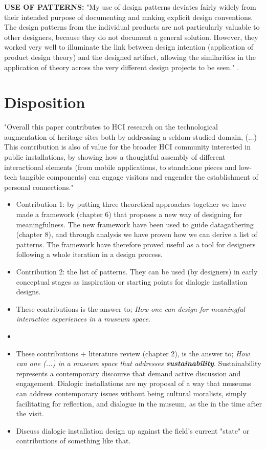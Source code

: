 \textbf{USE OF PATTERNS:} "My use of design patterns deviates fairly widely from their intended purpose of documenting and making explicit design conventions. The design patterns from the individual products are not particularly valuable to other designers, because they do not document a general solution. However, they worked very well to illuminate the link between design intention (application of product design theory) and the designed artifact, allowing the similarities in the application of theory across the very different design projects to be seen." \autocite[p. 402]{zimmerman_designing_2009}.




\section{Disposition}

"Overall this paper contributes to HCI research on the technological augmentation of heritage sites both by addressing a seldom-studied domain, (...) This contribution is also of value for the broader HCI community interested in public installations, by showing how a thoughtful assembly of different interactional elements (from mobile applications, to standalone pieces and low-tech tangible components) can engage visitors and engender the establishment of personal connections." \autocite{ciolfi_designing_2012}


\begin{itemize}
    \item Contribution 1: by putting three theoretical approaches together we have made a framework (chapter 6) that proposes a new way of designing for meaningfulness. The new framework have been used to guide datagathering (chapter 8), and through analysis we have proven how we can derive a list of patterns. The framework have therefore proved useful as a tool for designers following a whole iteration in a design process.
    
    
    \item Contribution 2: the list of patterns. They can be used (by designers) in early conceptual stages as inspiration or starting points for dialogic installation designs. 
    \item These contributions is the answer to; \emph{How one can design for meaningful interactive experiences in a museum space.}
    \item
    
     \item These contributions + literature review (chapter 2), is the answer to; \emph{How can one (...) in a museum space that addresses \textbf{sustainability}}. Sustainability represents a contemporary discourse that demand active discussion and engagement. Dialogic installations are my proposal of a way that museums can address contemporary issues without being cultural moralists, simply facilitating for reflection, and dialogue in the museum, as the  in the time after the visit. 
    \item Discuss dialogic installation design up against the field's current "state" or contributions of something like that.

\end{itemize}


